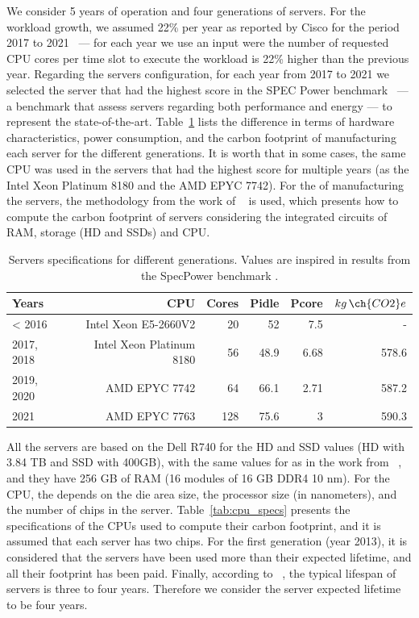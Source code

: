 We consider 5 years of operation and four generations of servers. For the workload growth, we assumed 22\% per year as reported by Cisco for the period 2017 to 2021~\cite{cisco_global_cloud_index_2018} --- for each year we use an input were the number of requested CPU cores per time slot to execute the workload is 22\% higher than the previous year. Regarding the servers configuration, for each year from 2017 to 2021 we selected the server that had the highest score in the SPEC Power benchmark~\cite{spec_power} --- a benchmark that assess servers regarding both performance and energy --- to represent the state-of-the-art. Table~\ref{tab:servers_specs} lists the difference in terms of hardware characteristics, power consumption, and the carbon footprint of manufacturing each server for the different generations.  It is worth  that in some cases, the same CPU was used in the servers that had the highest score for multiple years (as the Intel Xeon Platinum 8180 and the AMD EPYC 7742). For the  of manufacturing the servers, the methodology from the work of ~\citet{gupta2022_ACT} is used, which presents how to compute the carbon footprint of servers considering the integrated circuits of  RAM, storage (HD and SSDs) and CPU.


\begin{table}[h]
  \small
  \caption{Servers specifications for different generations. Values are inspired in results from the SpecPower benchmark \cite{spec_2014,spec_2017,spec_2016,spec_2019,spec_2021}.} \centering
  \label{tab:servers_specs} 
  \begin{tabular}{|l|r|r|r|r|r|}
  \hline    
  \textbf{Years} & \textbf{CPU} &   \textbf{Cores} & \textbf{Pidle}  & \textbf{Pcore}  & \textbf{$kg\,\ch{CO2}e$}  \\
  \hline
  < 2016      & Intel Xeon E5-2660V2 & 20 & 52 & 7.5  & -   \\
  \hline
  2017, 2018  & Intel Xeon Platinum 8180 & 56 & 48.9 & 6.68  & 578.6   \\
  \hline
  2019, 2020   & AMD EPYC 7742  & 64 & 66.1 & 2.71  & 587.2 \\
  \hline
  2021        & AMD EPYC 7763 & 128 & 75.6 & 3     & 590.3 \\
  \hline
\end{tabular}  
\end{table}

All the servers are based on the Dell R740 for the HD and SSD values (HD with 3.84 TB and SSD with 400GB), with the same values for  as in the work from ~\citet{gupta2022_ACT}, and they have 256 GB of RAM (16 modules of 16 GB DDR4 10 nm). For the CPU, the  depends on the die area size, the processor size (in nanometers), and the number of chips in the server. Table~\ref{tab:cpu_specs} presents the specifications of the CPUs used to compute their carbon footprint, and it is assumed that each server has two chips. For the first generation (year 2013), it is considered that the servers have been used more than their expected lifetime, and all their  footprint has been paid. Finally, according to ~\citet{datacenter_as_computer}, the typical lifespan of servers is three to four years. Therefore we consider the server expected lifetime to be four years.


